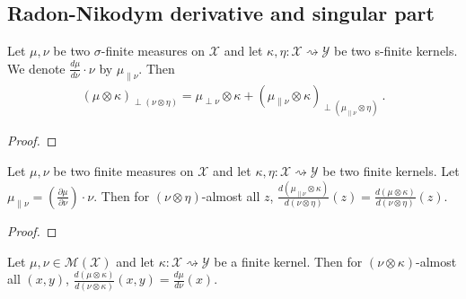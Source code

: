 \subsection{Radon-Nikodym derivative and singular part}

\begin{lemma}
  \label{lem:singularPart_compProd}
  Let $\mu, \nu$ be two $\sigma$-finite measures on $\mathcal X$ and let $\kappa, \eta : \mathcal X \rightsquigarrow \mathcal Y$ be two s-finite kernels.
  We denote $\frac{d\mu}{d\nu}\cdot \nu$ by $\mu_{\parallel \nu}$.
  Then
  \begin{align*}
  (\mu \otimes \kappa)_{\perp (\nu \otimes \eta)} = \mu_{\perp \nu} \otimes \kappa + (\mu_{\parallel \nu} \otimes \kappa)_{\perp (\mu_{\parallel \nu} \otimes \eta)}
  \: .
  \end{align*}
\end{lemma}

\begin{proof}%
\uses{}

\end{proof}


\begin{lemma}
  \label{lem:rnDeriv_eq_ac_left}
  \mathlibok
  \uses{}
  Let $\mu, \nu$ be two finite measures on $\mathcal X$ and let $\kappa, \eta : \mathcal X \rightsquigarrow \mathcal Y$ be two finite kernels.
  Let $\mu_{\parallel \nu} = \left(\frac{\partial \mu}{\partial \nu}\right) \cdot \nu$.
  Then for $(\nu \otimes \eta)$-almost all $z$, $\frac{d (\mu_{\parallel \nu} \otimes \kappa)}{d (\nu \otimes \eta)}(z) = \frac{d (\mu \otimes \kappa)}{d (\nu \otimes \eta)}(z)$.
\end{lemma}

\begin{proof}\mathlibok
{}
\end{proof}


\begin{lemma}
  \label{cor:rnDeriv_compProd_left}
  \mathlibok
  \uses{}
  Let $\mu, \nu \in \mathcal M(\mathcal X)$ and let $\kappa : \mathcal X \rightsquigarrow \mathcal Y$ be a finite kernel. Then for $(\nu \otimes \kappa)$-almost all $(x, y)$, $\frac{d (\mu \otimes \kappa)}{d (\nu \otimes \kappa)}(x,y) = \frac{d\mu}{d\nu}(x)$.
\end{lemma}

